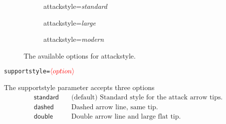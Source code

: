 \documentclass{article}
\newcommand{\opt}[2][red]{\ensuremath{\textcolor{#1}{\langle #2\rangle}}}
\begin{document}
\begin{figure}[!h]
    \begin{subfigure}{0.32\textwidth}
        \centering
        \begin{af}[attackstyle=standard]
    
        \end{af}
        \caption{\textsf{attackstyle}=\textit{standard}}
        \label{fig:attackstyle_standard}
    \end{subfigure}
    \hfill
    \begin{subfigure}{0.3\textwidth}
        \centering
        \begin{af}[attackstyle=large]
    
        \end{af}
        \caption{\textsf{attackstyle}=\textit{large}}
        \label{fig:attackstyle_large}
    \end{subfigure}
    \hfill
    \begin{subfigure}{0.3\textwidth}
        \centering
        \begin{af}[attackstyle=modern]
    
        \end{af}
        \caption{\textsf{attackstyle}=\textit{modern}}
        \label{fig:attackstyle_thick}
    \end{subfigure}
    \caption{The available options for \textsf{attackstyle}.}
    \label{fig:attackstyle}
\end{figure}

\noindent\texttt{supportstyle=}\opt{option}
    
    The \textsf{supportstyle} parameter accepts three options
    \begin{align*}
        \mathsf{standard} &\quad \text{(default) Standard style for the attack arrow tips.}\\
        \mathsf{dashed} &\quad \text{Dashed arrow line, same tip.}\\
        \mathsf{double} &\quad \text{Double arrow line and large flat tip.}\\
    \end{align*}
\end{document}
